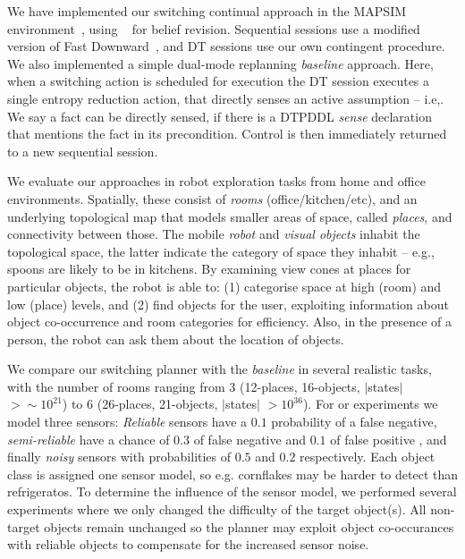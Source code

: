 
We have implemented our switching continual approach in the MAPSIM
environment~\cite{brenner:nebel:jaamas09},
using ~\cite{king:2009} for belief
revision. Sequential sessions use a modified version of Fast
Downward~\cite{fast-downward}, and DT sessions use our own contingent
procedure. We also implemented a simple dual-mode replanning {\em
baseline} approach. Here, when a switching action is scheduled for
execution the DT session executes a single entropy reduction action,
that directly senses an active assumption -- i.e,. We say a fact can
be directly sensed, if there is a DTPDDL {\em sense} declaration that
mentions the fact in its precondition.  Control is then immediately
returned to a new sequential session.


We evaluate our approaches in robot exploration tasks from home and
office environments. Spatially, these consist of {\em rooms}
(office/kitchen/etc), and an underlying topological map that models
smaller areas of space, called {\em places}, and connectivity between
those. The mobile {\em robot} and {\em visual objects} inhabit the
topological space, the latter indicate the category of space they
inhabit -- e.g., spoons are likely to be in kitchens. By examining
view cones at places for particular objects, the robot is able to: (1)
categorise space at high (room) and low (place) levels, and (2) find
objects for the user, exploiting information about object
co-occurrence and room categories for efficiency. Also, in the
presence of a person, the robot can ask them about the location of
objects. 


We compare our switching planner with the {\em baseline} in several
realistic tasks, with the number of rooms ranging from 3 (12-places,
16-objects, $|$states$|$$>\sim10^{21}$) to 6 (26-places, 21-objects,
$|$states$|$ $>10^{36}$). For or experiments we model three sensors:
{\em Reliable} sensors have a $0.1$ probability of a false negative,
{\em semi-reliable} have a chance of $0.3$ of false negative and $0.1$
of false positive , and finally {\em noisy} sensors with probabilities
of $0.5$ and $0.2$ respectively. Each object class is assigned one
sensor model, so e.g. cornflakes may be harder to detect than
refrigeratos. To determine the influence of the sensor model, we
performed several experiments where we only changed the difficulty of
the target object(s). All non-target objects remain unchanged so the
planner may exploit object co-occurances with reliable objects to
compensate for the increased sensor noise.

